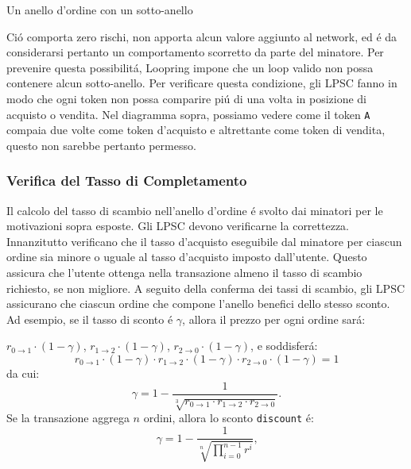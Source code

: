 \documentclass[UTF8,nofonts]{article}
\makeatletter
\newenvironment{figurehere}
 {\def\@captype{figure}}
 {}
\makeatother
\begin{document}
\begin{multicols}{2}
\begin{center}
\begin{figurehere}
\caption{Un anello d'ordine con un sotto-anello}
\label{fig:subring}
\end{figurehere}
\end{center}

Ci\'o comporta zero rischi, non apporta alcun valore aggiunto al network, ed \'e da considerarsi pertanto un comportamento scorretto da parte del minatore.  Per prevenire questa possibilit\'a, Loopring impone che un loop valido non possa contenere alcun sotto-anello.  Per verificare questa condizione, gli LPSC fanno in modo che ogni token non possa comparire pi\'u di una volta in posizione di acquisto o vendita. Nel diagramma sopra, possiamo vedere come il token \verb|A| compaia due volte  come token d'acquisto e altrettante come token di vendita, questo non sarebbe pertanto permesso.


\subsubsection{Verifica del Tasso di Completamento\label{sec:fill_rate_check}}


Il calcolo del tasso di scambio nell'anello d'ordine \'e svolto dai minatori per le motivazioni sopra esposte. Gli LPSC devono verificarne la correttezza. Innanzitutto verificano che il tasso d'acquisto eseguibile dal minatore per ciascun ordine sia minore o uguale al tasso d'acquisto imposto dall'utente. Questo assicura che l'utente ottenga nella transazione almeno il tasso di scambio richiesto, se non migliore.
A seguito della conferma dei tassi di scambio, gli LPSC assicurano che ciascun ordine che compone l'anello benefici dello stesso sconto. Ad esempio, se il tasso di sconto \'e $\gamma$, allora il prezzo per ogni ordine sar\'a:

$r_{0\rightarrow 1} \cdot (1-\gamma)$, $r_{1\rightarrow 2} \cdot (1-\gamma)$, $r_{2 \rightarrow 0} \cdot (1-\gamma)$, e soddisfer\'a:
\begin{equation}
r_{0\rightarrow 1} \cdot (1-\gamma)\cdot r_{1\rightarrow 2} \cdot (1-\gamma) \cdot r_{2 \rightarrow 0} \cdot (1-\gamma) = 1
\end{equation}
da cui:
\begin{equation}
\gamma = 1- \frac{1}{\sqrt[3]{r_{0\rightarrow 1} \cdot r_{1\rightarrow 2} \cdot r_{2\rightarrow 0}}}\text{.}
\end{equation}
Se la transazione aggrega $n$ ordini, allora lo sconto \texttt{discount} \'e:
\begin{equation}
\gamma = 1- \frac{1}{\sqrt[n]{\prod_{i=0}^{n-1} r^i}} \text{,}
\end{equation}


\end{multicols}
\end{document}
